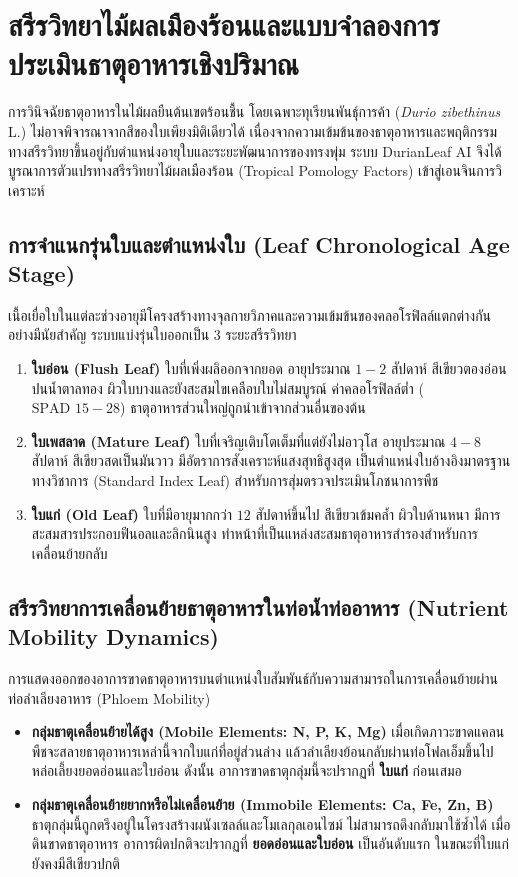 \section{สรีรวิทยาไม้ผลเมืองร้อนและแบบจำลองการประเมินธาตุอาหารเชิงปริมาณ}
การวินิจฉัยธาตุอาหารในไม้ผลยืนต้นเขตร้อนชื้น โดยเฉพาะทุเรียนพันธุ์การค้า (\textit{Durio zibethinus} L.) ไม่อาจพิจารณาจากสีของใบเพียงมิติเดียวได้ เนื่องจากความเข้มข้นของธาตุอาหารและพฤติกรรมทางสรีรวิทยาขึ้นอยู่กับตำแหน่งอายุใบและระยะพัฒนาการของทรงพุ่ม ระบบ DurianLeaf AI จึงได้บูรณาการตัวแปรทางสรีรวิทยาไม้ผลเมืองร้อน (Tropical Pomology Factors) เข้าสู่เอนจินการวิเคราะห์

\subsection{การจำแนกรุ่นใบและตำแหน่งใบ (Leaf Chronological Age Stage)}
เนื้อเยื่อใบในแต่ละช่วงอายุมีโครงสร้างทางจุลกายวิภาคและความเข้มข้นของคลอโรฟิลล์แตกต่างกันอย่างมีนัยสำคัญ ระบบแบ่งรุ่นใบออกเป็น 3 ระยะสรีรวิทยา
\begin{enumerate}
  \item \textbf{ใบอ่อน (Flush Leaf)} ใบที่เพิ่งผลิออกจากยอด อายุประมาณ $1 - 2$ สัปดาห์ สีเขียวตองอ่อนปนน้ำตาลทอง ผิวใบบางและยังสะสมไขเคลือบใบไม่สมบูรณ์ ค่าคลอโรฟิลล์ต่ำ ($\text{SPAD } 15 - 28$) ธาตุอาหารส่วนใหญ่ถูกนำเข้าจากส่วนอื่นของต้น
  \item \textbf{ใบเพสลาด (Mature Leaf)} ใบที่เจริญเติบโตเต็มที่แต่ยังไม่อาวุโส อายุประมาณ $4 - 8$ สัปดาห์ สีเขียวสดเป็นมันวาว มีอัตราการสังเคราะห์แสงสุทธิสูงสุด เป็นตำแหน่งใบอ้างอิงมาตรฐานทางวิชาการ (Standard Index Leaf) สำหรับการสุ่มตรวจประเมินโภชนาการพืช
  \item \textbf{ใบแก่ (Old Leaf)} ใบที่มีอายุมากกว่า $12$ สัปดาห์ขึ้นไป สีเขียวเข้มคล้ำ ผิวใบด้านหนา มีการสะสมสารประกอบฟีนอลและลิกนินสูง ทำหน้าที่เป็นแหล่งสะสมธาตุอาหารสำรองสำหรับการเคลื่อนย้ายกลับ
\end{enumerate}

\subsection{สรีรวิทยาการเคลื่อนย้ายธาตุอาหารในท่อน้ำท่ออาหาร (Nutrient Mobility Dynamics)}
การแสดงออกของอาการขาดธาตุอาหารบนตำแหน่งใบสัมพันธ์กับความสามารถในการเคลื่อนย้ายผ่านท่อลำเลียงอาหาร (Phloem Mobility)
\begin{itemize}
  \item \textbf{กลุ่มธาตุเคลื่อนย้ายได้สูง (Mobile Elements: N, P, K, Mg)} เมื่อเกิดภาวะขาดแคลน พืชจะสลายธาตุอาหารเหล่านี้จากใบแก่ที่อยู่ส่วนล่าง แล้วลำเลียงย้อนกลับผ่านท่อโฟลเอ็มขึ้นไปหล่อเลี้ยงยอดอ่อนและใบอ่อน ดังนั้น อาการขาดธาตุกลุ่มนี้จะปรากฏที่ \textbf{ใบแก่} ก่อนเสมอ
  \item \textbf{กลุ่มธาตุเคลื่อนย้ายยากหรือไม่เคลื่อนย้าย (Immobile Elements: Ca, Fe, Zn, B)} ธาตุกลุ่มนี้ถูกตรึงอยู่ในโครงสร้างผนังเซลล์และโมเลกุลเอนไซม์ ไม่สามารถดึงกลับมาใช้ซ้ำได้ เมื่อดินขาดธาตุอาหาร อาการผิดปกติจะปรากฏที่ \textbf{ยอดอ่อนและใบอ่อน} เป็นอันดับแรก ในขณะที่ใบแก่ยังคงมีสีเขียวปกติ
\end{itemize}

